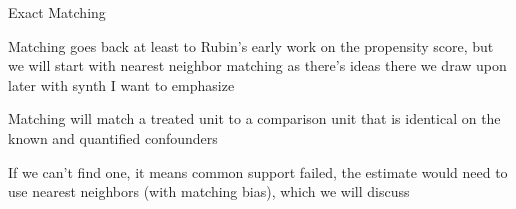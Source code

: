 \documentclass{beamer}
\begin{document}
\begin{frame}{Exact Matching}


Matching goes back at least to Rubin's early work on the propensity score, but we will start with nearest neighbor matching as there's ideas there we draw upon later with synth I want to emphasize

\bigskip

Matching will match a treated unit to a comparison unit that is identical on the known and quantified confounders

\bigskip

If we can't find one, it means common support failed, the estimate would need to use nearest neighbors (with matching bias), which we will discuss



\end{frame}
\end{document}
